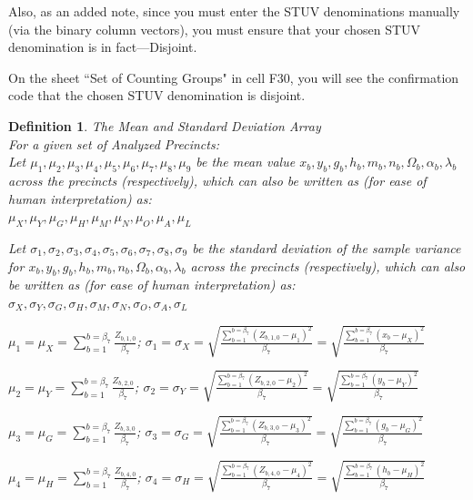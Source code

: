 \documentclass[preprint,13pt]{elsarticle}
\newtheorem{definition}{Definition}[section]
\begin{document}
Also, as an added note, since you must enter the STUV denominations manually (via the binary column vectors), you must ensure that your chosen STUV denomination is in fact---Disjoint.

On the sheet ``Set of Counting Groups" in cell F30, you will see the confirmation code that the chosen STUV denomination is disjoint.
\newpage
\begin{definition}{The Mean and Standard Deviation Array}\\
For a given set of Analyzed Precincts:\\
Let $\mu_{1}, \mu_{2}, \mu_{3}, \mu_{4}, \mu_{5}, \mu_{6}, \mu_{7}, \mu_{8}, \mu_{9}$ be the mean value $x_{b}, y_{b}, g_{b}, h_{b}, m_{b}, n_{b}, \Omega_{b}, \alpha_{b}, \lambda_{b}$ across the precincts (respectively), which can also be written as (for ease of human interpretation) as:\\
$\mu_{X}, \mu_{Y}, \mu_{G}, \mu_{H}, \mu_{M}, \mu_{N}, \mu_{O}, \mu_{A}, \mu_{L}$

Let $\sigma_{1}, \sigma_{2}, \sigma_{3}, \sigma_{4}, \sigma_{5}, \sigma_{6}, \sigma_{7}, \sigma_{8}, \sigma_{9}$ be the standard deviation of the sample variance for $x_{b}, y_{b}, g_{b}, h_{b}, m_{b}, n_{b}, \Omega_{b}, \alpha_{b}, \lambda_{b}$ across the precincts (respectively), which can also be written as (for ease of human interpretation) as:\\
$\sigma_{X}, \sigma_{Y}, \sigma_{G}, \sigma_{H}, \sigma_{M}, \sigma_{N}, \sigma_{O}, \sigma_{A}, \sigma_{L}$

$\mu_{1}=\mu_{X}=\sum_{b=1}^{b=\beta_{7}}\frac{Z_{b,1,0}}{\beta_{7}}$; $\sigma_{1}=\sigma_{X}=\sqrt{\frac{\sum_{b=1}^{b=\beta_{7}}(Z_{b,1,0}-\mu_{1})^2}{\beta_{7}}}=\sqrt{\frac{\sum_{b=1}^{b=\beta_{7}}(x_{b}-\mu_{X})^2}{\beta_{7}}}$

$\mu_{2}=\mu_{Y}=\sum_{b=1}^{b=\beta_{7}}\frac{Z_{b,2,0}}{\beta_{7}}$; $\sigma_{2}=\sigma_{Y}=\sqrt{\frac{\sum_{b=1}^{b=\beta_{7}}(Z_{b,2,0}-\mu_{2})^2}{\beta_{7}}}=\sqrt{\frac{\sum_{b=1}^{b=\beta_{7}}(y_{b}-\mu_{Y})^2}{\beta_{7}}}$

$\mu_{3}=\mu_{G}=\sum_{b=1}^{b=\beta_{7}}\frac{Z_{b,3,0}}{\beta_{7}}$; $\sigma_{3}=\sigma_{G}=\sqrt{\frac{\sum_{b=1}^{b=\beta_{7}}(Z_{b,3,0}-\mu_{3})^2}{\beta_{7}}}=\sqrt{\frac{\sum_{b=1}^{b=\beta_{7}}(g_{b}-\mu_{G})^2}{\beta_{7}}}$

$\mu_{4}=\mu_{H}=\sum_{b=1}^{b=\beta_{7}}\frac{Z_{b,4,0}}{\beta_{7}}$; $\sigma_{4}=\sigma_{H}=\sqrt{\frac{\sum_{b=1}^{b=\beta_{7}}(Z_{b,4,0}-\mu_{4})^2}{\beta_{7}}}=\sqrt{\frac{\sum_{b=1}^{b=\beta_{7}}(h_{b}-\mu_{H})^2}{\beta_{7}}}$


\end{definition}
\end{document}
